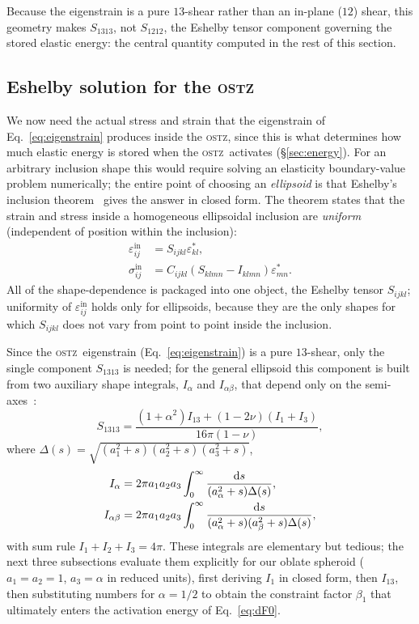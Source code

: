 \documentclass[5p,sort&compress]{elsarticle}
\newcommand{\OSTZ}{\textsc{ostz}}
\begin{document}
Because the eigenstrain is a pure $13$-shear rather than an in-plane
($12$) shear, this geometry makes $S_{1313}$, not $S_{1212}$, the
Eshelby tensor component governing the stored elastic energy:
the central quantity computed in the rest of this section.

\subsection{Eshelby solution for the \OSTZ}
\label{sec:eshelby}

We now need the actual stress and strain that the eigenstrain of
Eq.~\eqref{eq:eigenstrain} produces inside the \OSTZ, since this is
what determines how much elastic energy is stored when the \OSTZ\
activates (\S\ref{sec:energy}). For an arbitrary inclusion shape this
would require solving an elasticity boundary-value problem
numerically; the entire point of choosing an \emph{ellipsoid} is that
Eshelby's inclusion theorem~\cite{eshelby1957} gives the answer in
closed form. The theorem states that the strain and stress inside a
homogeneous ellipsoidal inclusion are \emph{uniform} (independent of
position within the inclusion):
\begin{align}
  \varepsilon_{ij}^\mathrm{in}&=S_{ijkl}\varepsilon^*_{kl},
    \label{eq:eshelby1}\\
  \sigma_{ij}^\mathrm{in}&=C_{ijkl}(S_{klmn}-I_{klmn})\varepsilon^*_{mn}.
    \label{eq:eshelby2}
\end{align}
All of the shape-dependence is packaged into one object, the Eshelby
tensor $S_{ijkl}$; uniformity of $\varepsilon^\mathrm{in}_{ij}$ holds
only for ellipsoids, because they are the only shapes for which
$S_{ijkl}$ does not vary from point to point inside the inclusion.

Since the \OSTZ\ eigenstrain (Eq.~\eqref{eq:eigenstrain}) is a pure
$13$-shear, only the single component $S_{1313}$ is needed; for the
general ellipsoid this component is built from two auxiliary shape
integrals, $I_\alpha$ and $I_{\alpha\beta}$, that depend only on the
semi-axes~\cite{mura1987}:
\begin{equation}
  S_{1313}=\frac{(1+\alpha^2)I_{13}+(1-2\nu)(I_1+I_3)}{16\pi(1-\nu)},
  \label{eq:S1313}
\end{equation}
where $\Delta(s)=\sqrt{(a_1^2{+}s)(a_2^2{+}s)(a_3^2{+}s)}$,
\begin{align}
  I_\alpha&=2\pi a_1 a_2 a_3\int_0^\infty
    \frac{\mathrm ds}{(a_\alpha^2+s)\Delta(s)},
    \label{eq:Ialpha}\\
  I_{\alpha\beta}&=2\pi a_1 a_2 a_3\int_0^\infty
    \frac{\mathrm ds}{(a_\alpha^2+s)(a_\beta^2+s)\Delta(s)},\notag
\end{align}
with sum rule $I_1+I_2+I_3=4\pi$. These integrals are elementary but
tedious; the next three subsections evaluate them explicitly for our
oblate spheroid ($a_1=a_2=1$, $a_3=\alpha$ in reduced units), first
deriving $I_1$ in closed form, then $I_{13}$, then substituting
numbers for $\alpha=1/2$ to obtain the constraint factor $\beta_1$
that ultimately enters the activation energy of Eq.~\eqref{eq:dF0}.
\end{document}

